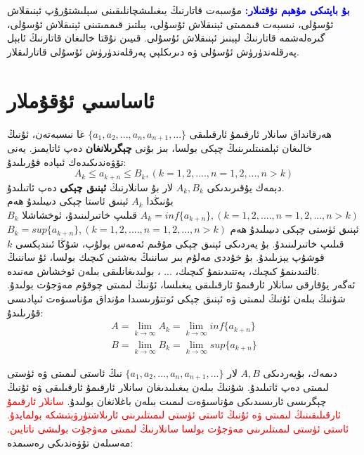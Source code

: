 \par\bigskip
\begin{tcolorbox}
\textcolor{blue}{\textbf{بۇ باپتىكى مۇھېم نۇقتىلار:}}
مۇسبەت قاتارنىڭ يىغىلىشچانلىقىنى سېلىشتۇرۇپ ئېنىقلاش ئۇسۇلى، نىسبەت قىممىتى ئېنىقلاش ئۇسۇلى، يىلتىز قىممىتىنى ئېنىقلاش ئۇسۇلى، گىرەلەشمە قاتارنىڭ لېبنىز ئېنىقلاش ئۇسۇلى. قىيىن نۇقتا خالىغان قاتارنىڭ ئابېل پەرقلەندۈرۈش ئۇسۇلى ۋە دىرىكلېي پەرقلەندۈرۈش ئۇسۇلى قاتارلىقلار.
\end{tcolorbox}

\section{ئاساسىي ئۇقۇملار}
ھەرقانداق سانلار ئارقىمۇ ئارقىلىقى 
$\{a_1,a_2,...,a_n,a_{n+1},...\}$
غا نىسبەتەن، ئۇنىڭ خالىغان ئېلمنىتلىرىنىڭ چېكى بولسا، بىز بۇنى \textbf{چېگرىلانغان} دەپ ئاتايمىز. يەنى تۆۋەندىكىدەك ئىپادە قۇرىلىدۇ:
$$
A_k \le a_{k+n} \le B_k, (k=1,2,....,n=1,2,..., n>k)
$$
دېمەك يۇقىرىدىكى $A_k,B_k$ لار بۇ سانلارنىڭ \textbf{ئېنىق چېكى} دەپ ئاتىلىدۇ.\\بۇنىڭدا $A_k$ ئېنىق ئاستا چېكى دىيىلىدۇ ھەم
$A_k = inf \{a_{k+n}\},(k=1,2,....,n=1,2,..., n>k)$
قىلىپ خاتىرلىنىدۇ، ئوخشاشلا $B_k$ ئېنىق ئۈستى چېكى دىيىلىدۇ ھەم
$B_k = sup \{a_{k+n}\},(k=1,2,....,n=1,2,..., n>k)$
قىلىپ خاتىرلىنىدۇ.
بۇ يەردىكى ئېنىق چېكى مۇقىم ئەمەس بولۇپ، شۇڭا ئىندېكسى $k$ قوشۇپ يېزىلىدۇ. بۇ خۇددى مەلۇم بىر ساننىڭ بەشتىن كىچىك بولسا، ئۇ ساننىڭ ئالتىدىنمۇ كىچىك، يەتتىدىنمۇ كىچىك، ... ، بولىدىغانلىقى بىلەن ئوخشاش مەنىدە.\\
ئەگەر يۇقارقى سانلار ئارقىمۇ ئارقىلىقى يىغىلسا، ئۇنىڭ لىمىتى چوقۇم مەۋجۇت بولىدۇ. شۇنىڭ بىلەن ئۇنىڭ لىمىتى ۋە ئېنىق چېكى ئوتتۇرىسىدا  مۇنداق مۇناسىۋەت ئىپادىسى قۇرىلىدۇ:
\begin{align*}
A = \lim_{k \to \infty}A_k = \lim_{k\to\infty} inf \{a_{k+n}\} \\
B = \lim_{k \to \infty}B_k = \lim_{k\to\infty} sup \{a_{k+n}\}
\end{align*}

دىمەك، بۇيەردىكى $A,B$ لار $\{a_1,a_2,...,a_n,a_{n+1},...\}$ نىڭ ئاستى لىمىتى ۋە ئۈستى لىمىتى دەپ ئاتىلىدۇ. شۇنىڭ بىلەن يىغىلىدىغان سانلار ئارقىمۇ ئارقىلىقى ۋە ئۇنىڭ چېگرىسى ئارىسىدىكى مۇناسىۋەت لىمىت بىلەن باغلانغان بولىدۇ.
\textcolor{red}{
سانلار ئارقىمۇ ئارقىلىقىنىڭ لىمىتى ۋە ئۇنىڭ ئاستى ئۈستى لىمىتلىرىنى ئارىلاشتۈرۋېتىشكە بولمايدۇ. ئاستى ئۈستى لىمىتلىرىنى مەۋجۇت بولسا سانلارنىڭ لىمىتى مەۋجۇت بولىشى ناتايىن.} مەسىلەن تۆۋەندىكى رەسىمدە:\\
\begin{figure}[htbp]
\hskip 10pt
\end{figure}

